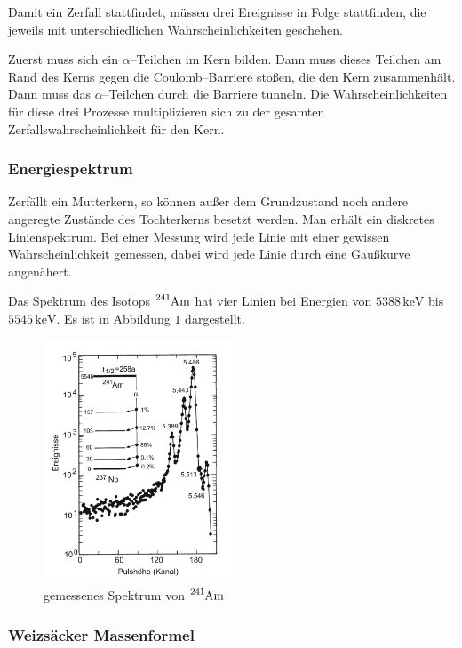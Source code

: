 \documentclass[12pt,a4paper]{scrartcl}
\numberwithin{equation}{section} %
\begin{document}
Damit ein Zerfall stattfindet, müssen drei Ereignisse in Folge stattfinden, die jeweils mit unterschiedlichen Wahrscheinlichkeiten geschehen.

Zuerst muss sich ein $\alpha$--Teilchen im Kern bilden. Dann muss dieses Teilchen am Rand des Kerns gegen die Coulomb--Barriere stoßen, die den Kern zusammenhält. Dann muss das $\alpha$--Teilchen durch die Barriere tunneln. Die Wahrscheinlichkeiten für diese drei Prozesse multiplizieren sich zu der gesamten Zerfallswahrscheinlichkeit für den Kern.

\hypertarget{energiespektrum}{%
\subsubsection{Energiespektrum}\label{energiespektrum}}

Zerfällt ein Mutterkern, so können außer dem Grundzustand noch andere angeregte Zustände des Tochterkerns besetzt werden. Man erhält ein diskretes Linienspektrum. Bei einer Messung wird jede Linie mit einer gewissen Wahrscheinlichkeit gemessen, dabei wird jede Linie durch eine
Gaußkurve angenähert.

Das Spektrum des Isotops $\ce{^241Am}$ hat vier Linien bei Energien von $5388\mathrm{\,keV}$ bis $5545\mathrm{\,keV}$. \cite{Bethge} Es ist in Abbildung $1$ dargestellt.

\begin{figure}[h!]
	\centering
	\includegraphics[width=0.5\textwidth]{../media/B3.3/Am241_Spektrum.pdf}
	\caption{gemessenes Spektrum von $\ce{^241Am}$ \cite{Bethge}}
	\label{abb:Spektrum 241Am}
\end{figure}

\hypertarget{weizsuxe4cker-massenformel}{%
\subsubsection{Weizsäcker
Massenformel}\label{weizsuxe4cker-massenformel}}
\end{document}
